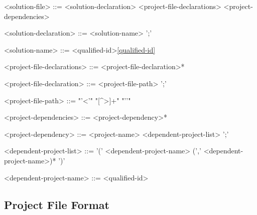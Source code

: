 \documentclass[a4paper,oneside,11pt]{article}
\begin{document}
\begin{grammar}
<solution-file> ::= <solution-declaration> <project-file-declarations> <project-dependencies>

<solution-declaration> ::=  <solution-name> ';'

<solution-name> ::= <qualified-id>\ref{qualified-id}

<project-file-declarations> ::= <project-file-declaration>*

<project-file-declaration> ::=  <project-file-path> ';'

<project-file-path> ::= "'<'" "[^>]+" "'\>'"

<project-dependencies> ::= <project-dependency>*

<project-dependency> ::=  <project-name> <dependent-project-list> ';'

<dependent-project-list> ::= '(' <dependent-project-name> (',' <dependent-project-name>)* ')'

<dependent-project-name> ::= <qualified-id>

\end{grammar}

\subsection{Project File Format}
\end{document}
